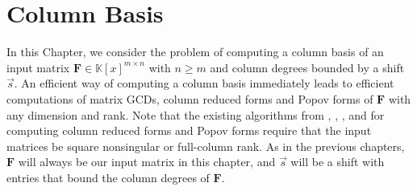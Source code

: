
\chapter{\label{chap:Matrix-GCD}Column Basis}

In this Chapter, we consider the problem of computing a column basis
of an input matrix $\mathbf{F}\in\mathbb{K}\left[x\right]^{m\times n}$
with $n\ge m$ and column degrees bounded by a shift $\vec{s}$. An
efficient way of computing a column basis immediately leads to efficient
computations of matrix GCDs, column reduced forms and Popov forms
of $\mathbf{F}$ with any dimension and rank. Note that the existing
algorithms from \citet{Giorgi2003}, \citet{GSSV2012},\citet{beelen:1988,sarkar2011}
\citet{SS2011}, and \citet{sarkar2011,bcl:2006} \citet{sarkar2011}for
computing column reduced forms and Popov forms require that the input
matrices be square nonsingular or full-column rank. As in the previous
chapters, $\mathbf{F}$ will always be our input matrix in this chapter,
and $\vec{s}$ will be a shift with entries that bound the column
degrees of $\mathbf{F}$.

